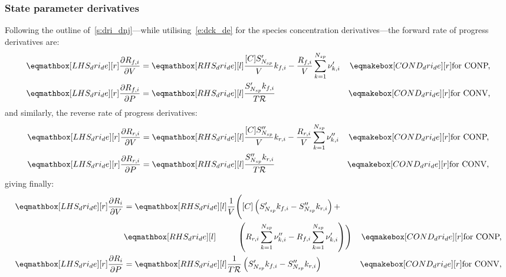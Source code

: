 \documentclass[12pt]{article}
\newcommand{\ns}{N_{sp}}
\newcommand{\conp}{CONP}
\newcommand{\conv}{CONV}
\newcommand{\dconp}{\ifmmode\text{for \conp,}\else for \conp,\fi}
\newcommand{\dconv}{\ifmmode\text{for \conv,}\else for \conv.\fi}
\newcommand{\Ru}{\mathcal{R}}
\begin{document}
\subsubsection{State parameter derivatives}
\label{s:dri_de}
Following the outline of~\cref{s:dri_dnj}---while utilising~\cref{e:dck_de} for the species concentration derivatives---the forward rate of progress derivatives are:
\begin{subequations}
 \begin{align}
  \lhs{dri_de}{\frac{\partial {R_{f, i}} }{\partial V }} &= \rhs{dri_de}{\frac{[C] S^{\prime}_{\ns}}{V} {k_{f, i}} - \frac{{R_{f, i}}}{V} \sum_{k=1}^{\ns} \nu^{\prime}_{k,i}}&\cond{dri_de}{\dconp}\\
  \lhs{dri_de}{\frac{\partial {R_{f, i}} }{\partial P }} &= \rhs{dri_de}{\frac{S^{\prime}_{\ns} {k_{f, i}}}{T \Ru}}&\cond{dri_de}{\dconv}
 \end{align}
\end{subequations}
and similarly, the reverse rate of progress derivatives:
\begin{subequations}
 \begin{align}
  \lhs{dri_de}{\frac{\partial {R_{r, i}} }{\partial V }} &= \rhs{dri_de}{\frac{[C] S^{\prime\prime}_{\ns}}{V} {k_{r, i}} - \frac{{R_{r, i}}}{V} \sum_{k=1}^{\ns} \nu^{\prime\prime}_{k,i}}&\cond{dri_de}{\dconp}\\
  \lhs{dri_de}{\frac{\partial {R_{r, i}} }{\partial P }} &= \rhs{dri_de}{\frac{S^{\prime\prime}_{\ns} {k_{r, i}}}{T \Ru}}&\cond{dri_de}{\dconv}
 \end{align}
\end{subequations}
giving finally:
\begin{subequations}
 \label{e:dropi_de}
 \begin{align}
  \lhs{dri_de}{\frac{\partial {R}_{i} }{\partial V }} &= \rhs{dri_de}{\frac{1}{V}\Biggl( [C]\left(S^{\prime}_{\ns} {k_{f, i}} - S^{\prime\prime}_{\ns} {k_{r, i}}\right) + } & \nonumber\\
  & \rhs{dri_de}{\mathindent[farth] \left({R_{r, i}} \sum_{k=1}^{\ns} \nu^{\prime\prime}_{k,i} - {R_{f, i}} \sum_{k=1}^{\ns} \nu^{\prime}_{k,i}\right) \Biggr)}&\cond{dri_de}{\dconp}\\
  \lhs{dri_de}{\frac{\partial {R}_{i} }{\partial P }} &= \rhs{dri_de}{\frac{1}{T \Ru} \left(S^{\prime}_{\ns} {k_{f, i}} - S^{\prime\prime}_{\ns} {k_{r, i}}\right)}&\cond{dri_de}{\dconv}
 \end{align}
\end{subequations}
\end{document}
